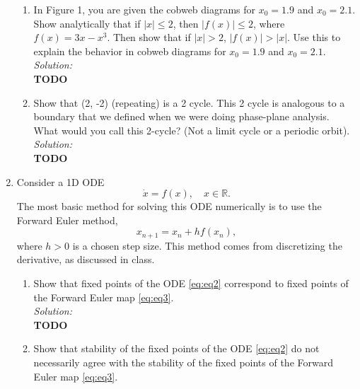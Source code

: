 \documentclass[10pt]{amsart}
\theoremstyle{nonumberplain}
\begin{document}
\begin{enumerate}[label={\bf {\arabic*}:}]
\begin{enumerate}
\item In Figure 1, you are given the cobweb diagrams for $x_0 = 1.9$ and $x_0 = 2.1$.
Show analytically that if $|x| \leq 2$, then $|f(x)| \leq 2$, where $f(x) = 3x - x^3$.
Then show that if $|x| > 2$, $|f(x)| > |x|$.
Use this to explain the behavior in cobweb diagrams for $x_0 = 1.9$ and $x_0 = 2.1$.  \\

\textit{Solution:} \\
\textbf{TODO} \\

\item Show that (2, -2) (repeating) is a 2 cycle.
This 2 cycle is analogous to a boundary that we defined when we were doing phase-plane analysis.
What would you call this 2-cycle? (Not a limit cycle or a periodic orbit). \\

\textit{Solution:} \\
\textbf{TODO} \\

\end{enumerate}

\item Consider a 1D ODE
\begin{equation}
\dot x = f(x), \quad x \in \mathbb R.
\label{eq:eq2}
\end{equation}
The most basic method for solving this ODE numerically is to use the Forward Euler method,
\begin{equation}
x_{n + 1} = x_n + hf(x_n),
\label{eq:eq3}
\end{equation}
where $h > 0$ is a chosen step size.
This method comes from discretizing the derivative, as discussed in class. \\

\begin{enumerate}
\item Show that fixed points of the ODE \eqref{eq:eq2} correspond to fixed points of the Forward Euler map \eqref{eq:eq3}. \\

\textit{Solution:} \\
\textbf{TODO} \\

\item Show that stability of the fixed points of the ODE \eqref{eq:eq2} do not necessarily agree with the stability of the fixed points of the Forward Euler map \eqref{eq:eq3}. \\


\end{enumerate}
\end{enumerate}
\end{document}
